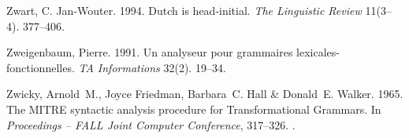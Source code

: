 \begin{thebibliography}{1420}
Zwart, C. Jan-Wouter. 1994.
\newblock Dutch is head-initial.
\newblock \emph{The Linguistic Review} 11(3--4). 377--406.

Zweigenbaum, Pierre. 1991.
\newblock Un analyseur pour grammaires lexicales-fonctionnelles.
\newblock \emph{TA Informations} 32(2). 19--34.

Zwicky, Arnold~M., Joyce Friedman, Barbara~C. Hall \& Donald~E. Walker. 1965.
\newblock The {MITRE} syntactic analysis procedure for {Transformational
  Grammars}.
\newblock In \emph{Proceedings -- {FALL Joint Computer Conference}}, 317--326.
\newblock {}.

\end{thebibliography}
